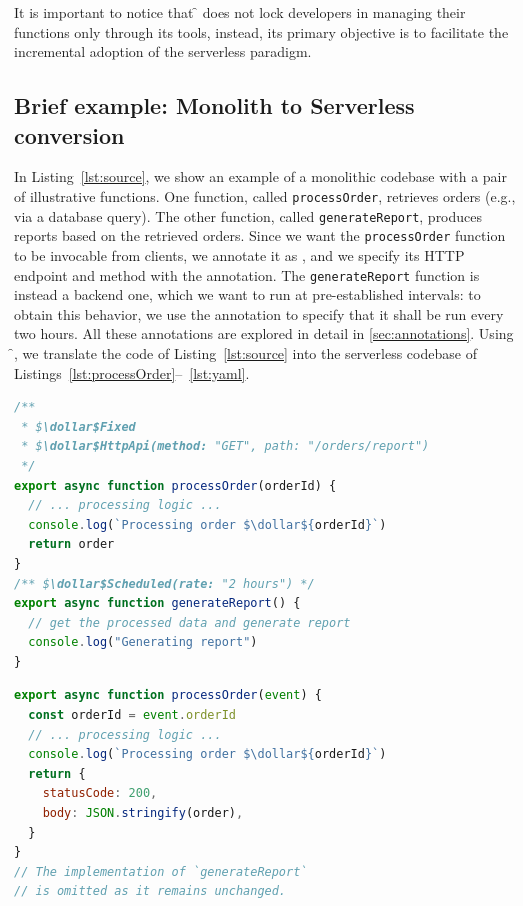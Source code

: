 It is important to notice that \f{} does not lock developers in managing their
functions only through its tools, instead, its primary objective is to facilitate
the incremental adoption of the serverless paradigm.

\subsection{Brief example: Monolith to Serverless conversion}

In Listing~\ref{lst:source}, we show an example of a monolithic codebase with a
pair of illustrative functions. One function, called \verb|processOrder|,
retrieves orders (e.g., via a database query). The other function, called
\verb|generateReport|, produces reports based on the retrieved orders. Since
we want the \verb|processOrder| function to be invocable from clients, we
annotate it as , and we specify its HTTP endpoint and method
with the  annotation. The \verb|generateReport| function
is instead a backend one, which we want to run at pre-established intervals: to
obtain this behavior, we use the  annotation to specify
that it shall be run every two hours.
All these annotations are explored in detail in \cref{sec:annotations}.
Using \f{}, we translate the code of Listing~\ref{lst:source} into the
serverless codebase of Listings~\ref{lst:processOrder}--~\ref{lst:yaml}.

\begin{lstlisting}[language=javascript, caption={Source Code.}, label=lst:source]
/**
 * $\dollar$Fixed
 * $\dollar$HttpApi(method: "GET", path: "/orders/report")
 */
export async function processOrder(orderId) {
  // ... processing logic ...
  console.log(`Processing order $\dollar${orderId}`)
  return order
}
/** $\dollar$Scheduled(rate: "2 hours") */
export async function generateReport() {
  // get the processed data and generate report
  console.log("Generating report")
}
\end{lstlisting}

\begin{lstlisting}[language=javascript, caption={Generated Code.}, label=lst:processOrder]
export async function processOrder(event) {
  const orderId = event.orderId
  // ... processing logic ...
  console.log(`Processing order $\dollar${orderId}`)
  return {
    statusCode: 200,
    body: JSON.stringify(order),
  }
}
// The implementation of `generateReport`
// is omitted as it remains unchanged.
\end{lstlisting}

